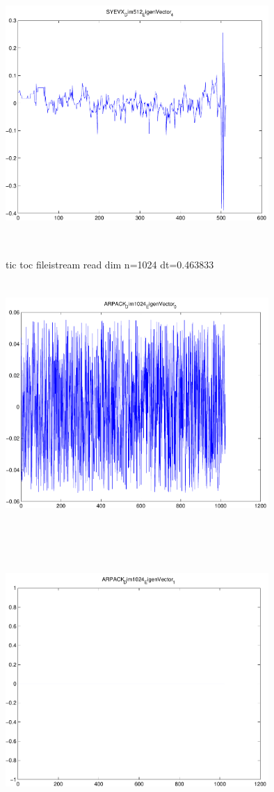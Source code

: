 \documentclass[9pt]{article}
\theoremstyle{plain}
\theoremstyle{definition}
\theoremstyle{remark}
\numberwithin{equation}{section}
\begin{document}
\includegraphics[width=10.0cm,height=10.0cm]{SYEVX_Dim512_EigenVector_4.pdf}

tic toc fileistream read dim n=1024 dt=0.463833
\includegraphics[width=10.0cm,height=10.0cm]{ARPACK_Dim1024_EigenVector_0.pdf}

\includegraphics[width=10.0cm,height=10.0cm]{ARPACK_Dim1024_EigenVector_1.pdf}
\end{document}
